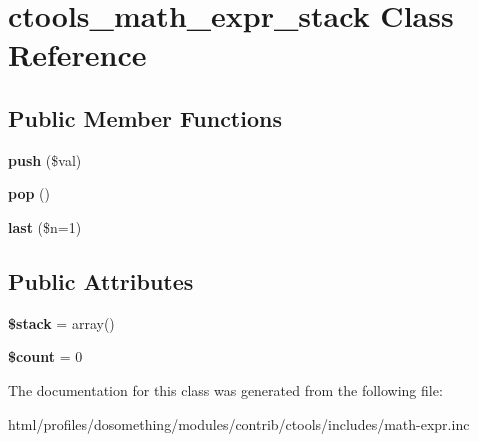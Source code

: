 \hypertarget{classctools__math__expr__stack}{
\section{ctools\_\-math\_\-expr\_\-stack Class Reference}
\label{classctools__math__expr__stack}
}
\subsection*{Public Member Functions}
\begin{DoxyCompactItemize}
\item 
\hypertarget{classctools__math__expr__stack_a6241a61750e6bd23ebfe49de38d666f8}{
{\bfseries push} (\$val)}
\label{classctools__math__expr__stack_a6241a61750e6bd23ebfe49de38d666f8}

\item 
\hypertarget{classctools__math__expr__stack_ac05d3cdf1f4953cc6e3f3f0bf098340d}{
{\bfseries pop} ()}
\label{classctools__math__expr__stack_ac05d3cdf1f4953cc6e3f3f0bf098340d}

\item 
\hypertarget{classctools__math__expr__stack_a7274443ccdc4d00a651ebe9112156336}{
{\bfseries last} (\$n=1)}
\label{classctools__math__expr__stack_a7274443ccdc4d00a651ebe9112156336}

\end{DoxyCompactItemize}
\subsection*{Public Attributes}
\begin{DoxyCompactItemize}
\item 
\hypertarget{classctools__math__expr__stack_a492f54320b8dd8386394a51ff13919b8}{
{\bfseries \$stack} = array()}
\label{classctools__math__expr__stack_a492f54320b8dd8386394a51ff13919b8}

\item 
\hypertarget{classctools__math__expr__stack_a99ddd39c284da3ab743364499fca9834}{
{\bfseries \$count} = 0}
\label{classctools__math__expr__stack_a99ddd39c284da3ab743364499fca9834}

\end{DoxyCompactItemize}


The documentation for this class was generated from the following file:\begin{DoxyCompactItemize}
\item 
html/profiles/dosomething/modules/contrib/ctools/includes/math-\/expr.inc\end{DoxyCompactItemize}
